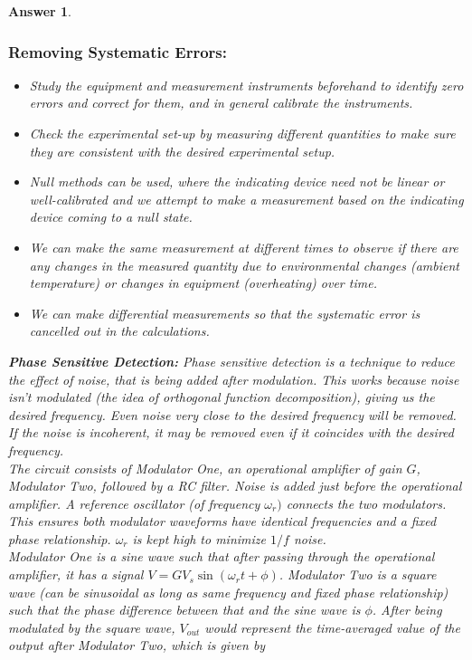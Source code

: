 \documentclass[a4paper]{article}
\newtheorem{ans}{Answer}[section]
\theoremstyle{new}
\begin{document}
\begin{ans}
\subsubsection*{Removing Systematic Errors:} 
\begin{itemize}
    \item Study the equipment and measurement instruments beforehand to identify zero errors and correct for them, and in general calibrate the instruments.
    \item Check the experimental set-up by measuring different quantities to make sure they are consistent with the desired experimental setup.
    \item Null methods can be used, where the indicating device need not be linear or well-calibrated and we attempt to make a measurement based on the indicating device coming to a null state.
    \item We can make the same measurement at different times to observe if there are any changes in the measured quantity due to environmental changes (ambient temperature) or changes in equipment (overheating) over time.
    \item We can make differential measurements so that the systematic error is cancelled out in the calculations.
\end{itemize}
\textbf{Phase Sensitive Detection:} Phase sensitive detection is a technique to reduce the effect of noise, that is being added after modulation. This works because noise isn't modulated (the idea of orthogonal function decomposition), giving us the desired frequency. Even noise very close to the desired frequency will be removed. If the noise is incoherent, it may be removed even if it coincides with the desired frequency.\\[5pt]
The circuit consists of Modulator One, an operational amplifier of gain $G$, Modulator Two, followed by a RC filter. Noise is added just before the operational amplifier. A reference oscillator (of frequency $\omega_r)$ connects the two modulators. This ensures both modulator waveforms have identical frequencies and a fixed phase relationship. $\omega_r$ is kept high to minimize $1/f$ noise.\\[5pt]
Modulator One is a sine wave such that after passing through the operational amplifier, it has a signal $V=GV_s\sin(\omega_rt+\phi)$. Modulator Two is a square wave (can be sinusoidal as long as same frequency and fixed phase relationship) such that the phase difference between that and the sine wave is $\phi$. After being modulated by the square wave, $V_{out}$ would represent the time-averaged value of the output after Modulator Two, which is given by 

\end{ans}
\end{document}
